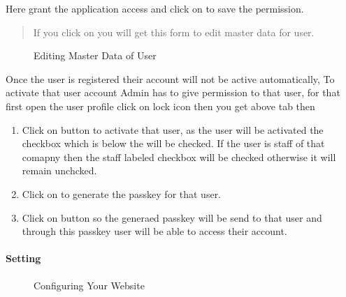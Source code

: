 \documentclass[a4paper,10pt,english]{report}
\begin{document}
Here grant the application access and click on  to save the permission.
\begin{quote}

If you click on  you will get this form to edit master data for user.
\end{quote}

\begin{figure}[htbp]
\centering
\capstart

\noindent{}
\caption{Editing Master Data of User}\label{\detokenize{mng users:id10}}\label{\detokenize{mng users:id5}}\end{figure}

Once the user is registered their account will not be active automatically, To activate that user account Admin has to give permission to that user, for that first open the user profile click on lock icon then you get above tab then
\begin{enumerate}
\def\theenumi{\arabic{enumi}}
\def\labelenumi{\theenumi .}
\makeatletter\def\p@enumii{\p@enumi \theenumi .}\makeatother
\item {} 
Click on  button to activate that user, as the user will be activated the checkbox which is below the  will be checked. If the user is staff of that comapny then the staff labeled checkbox will be checked otherwise it will remain unchcked.

\item {} 
Click on  to generate the passkey for that user.

\item {} 
Click on  button so the generaed passkey will be send to that user and through this passkey user will be able to access their account.

\end{enumerate}


\paragraph{Setting}
\label{\detokenize{globalsetting:setting}}\label{\detokenize{globalsetting::doc}}
\begin{figure}[htbp]
\centering
\capstart

\noindent{}
\caption{Configuring Your Website}\label{\detokenize{globalsetting:id4}}\label{\detokenize{globalsetting:id1}}\end{figure}
\end{document}
